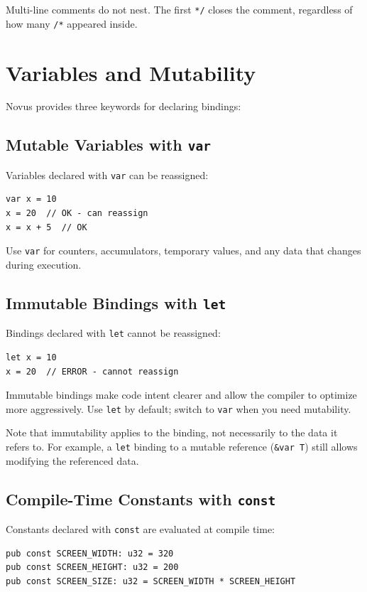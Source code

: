 Multi-line comments do not nest. The first \texttt{*/} closes the comment, regardless of how many \texttt{/*} appeared inside.

\section{Variables and Mutability}

Novus provides three keywords for declaring bindings:

\subsection{Mutable Variables with \texttt{var}}

Variables declared with \texttt{var} can be reassigned:

\begin{lstlisting}
var x = 10
x = 20  // OK - can reassign
x = x + 5  // OK
\end{lstlisting}

Use \texttt{var} for counters, accumulators, temporary values, and any data that changes during execution.

\subsection{Immutable Bindings with \texttt{let}}

Bindings declared with \texttt{let} cannot be reassigned:

\begin{lstlisting}
let x = 10
x = 20  // ERROR - cannot reassign
\end{lstlisting}

Immutable bindings make code intent clearer and allow the compiler to optimize more aggressively. Use \texttt{let} by default; switch to \texttt{var} when you need mutability.

Note that immutability applies to the binding, not necessarily to the data it refers to. For example, a \texttt{let} binding to a mutable reference (\texttt{\&var T}) still allows modifying the referenced data.

\subsection{Compile-Time Constants with \texttt{const}}

Constants declared with \texttt{const} are evaluated at compile time:

\begin{lstlisting}
pub const SCREEN_WIDTH: u32 = 320
pub const SCREEN_HEIGHT: u32 = 200
pub const SCREEN_SIZE: u32 = SCREEN_WIDTH * SCREEN_HEIGHT
\end{lstlisting}

